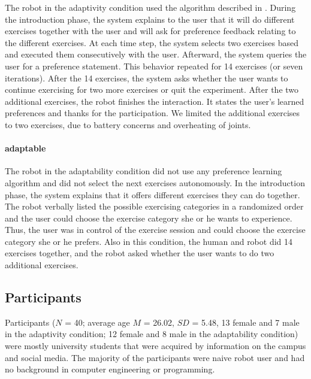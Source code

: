 \documentclass[twocolumn]{svjour3}          %
\begin{document}
The robot in the adaptivity condition used the algorithm described in
\autocite{wu2016double}. During the introduction phase, the system
explains to the user that it will do different exercises together with
the user and will ask for preference feedback relating to the different
exercises. At each time step, the system selects two exercises based and
executed them consecutively with the user. Afterward, the system queries
the user for a preference statement. This behavior repeated for 14
exercises (or seven iterations). After the 14 exercises, the system asks
whether the user wants to continue exercising for two more exercises or
quit the experiment. After the two additional exercises, the robot
finishes the interaction. It states the user's learned preferences and
thanks for the participation. We limited the additional exercises to two
exercises, due to battery concerns and overheating of joints.

\hypertarget{adaptability}{%
\paragraph{adaptable}\label{adaptability}}

The robot in the adaptability condition did not use any preference
learning algorithm and did not select the next exercises autonomously.
In the introduction phase, the system explains that it offers different
exercises they can do together. The robot verbally listed the possible
exercising categories in a randomized order and the user could choose
the exercise category she or he wants to experience. Thus, the user was
in control of the exercise session and could choose the exercise
category she or he prefers. Also in this condition, the human and robot
did 14 exercises together, and the robot asked whether the user wants to
do two additional exercises.

\hypertarget{participants}{%
\subsection{Participants}\label{participants}}

Participants (\(N\) = 40; average age \(M\) = 26.02, \(SD\) = 5.48, 13
female and 7 male in the adaptivity condition; 12 female and 8 male in
the adaptability condition) were mostly university students that were
acquired by information on the campus and social media. The majority of
the participants were naive robot user and had no background in computer
engineering or programming.
\end{document}
